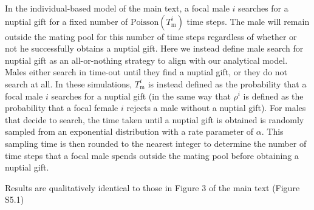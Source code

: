 \documentclass[
]{article}
\begin{document}
In the individual-based model of the main text, a focal male \(i\)
searches for a nuptial gift for a fixed number of
\(\mathrm{Poisson}(T^{i}_\mathrm{m})\) time steps. The male will remain
outside the mating pool for this number of time steps regardless of
whether or not he successfully obtains a nuptial gift. Here we instead
define male search for nuptial gift as an all-or-nothing strategy to
align with our analytical model. Males either search in time-out until
they find a nuptial gift, or they do not search at all. In these
simulations, \(T^{i}_\mathrm{m}\) is instead defined as the probability
that a focal male \(i\) searches for a nuptial gift (in the same way
that \(\rho^{i}\) is defined as the probability that a focal female
\(i\) rejects a male without a nuptial gift). For males that decide to
search, the time taken until a nuptial gift is obtained is randomly
sampled from an exponential distribution with a rate parameter of
\(\alpha\). This sampling time is then rounded to the nearest integer to
determine the number of time steps that a focal male spends outside the
mating pool before obtaining a nuptial gift.

Results are qualitatively identical to those in Figure 3 of the main
text (Figure S5.1)

\captionsetup{labelformat=empty}
\end{document}

